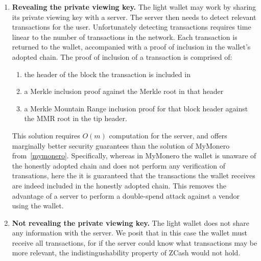 \begin{enumerate}
    \item \textbf{Revealing the private viewing key.} The light wallet may work by sharing its private viewing key with a server. The server then needs to detect relevant transactions for the user. Unfortunately detecting transactions requires time linear to the number of transactions in the network. Each transaction is returned to the wallet, accompanied with a proof of inclusion in the wallet's adopted chain. The proof of inclusion of a transaction is comprised of:
    \begin{enumerate}
        \item the header of the block the transaction is included in
        \item a Merkle inclusion proof against the Merkle root in that header
        \item a Merkle Mountain Range inclusion proof for that block header against the MMR root in the tip header.
    \end{enumerate}
    This solution requires $O(m)$ computation for the server, and offers marginally better security guarantees than the solution of MyMonero from~\cref{mymonero}. Specifically, whereas in MyMonero the wallet is unaware of the honestly adopted chain and does not perform any verification of transations, here the it is guaranteed that the transactions the wallet receives are indeed included in the honestly adopted chain. This removes the advantage of a server to perform a double-spend attack against a vendor using the wallet.
    \item \textbf{Not revealing the private viewing key.} The light wallet does not share any information with the server. We posit that in this case the wallet must receive all transactions, for if the server could know what transactions may be more relevant, the indistingushability property of ZCash would not hold.
\end{enumerate}
